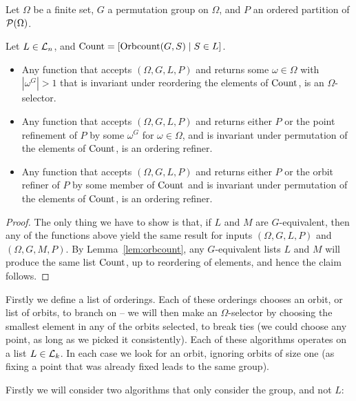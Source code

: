 \begin{lem}\label{lem:orbcount2}
  Let $\Omega$ be a finite set,  $G$ a permutation group on $\Omega$, and $P$
  an ordered partition of $\mathcal{P}(\Omega)$. 
  
  Let $L \in \mathcal{L}_n$, and
  \(\operatorname{Count} = [ \operatorname{Orbcount}(G,S) \mid S \in L ]\).

  \begin{itemize}
  \item Any function that accepts \((\Omega, G, L, P)\) and returns
    some \(\omega \in \Omega\) with $|\omega^G| > 1$ that is invariant
    under reordering the elements of \(\operatorname{Count}\), is an \(\Omega\)-selector.

  \item Any function that accepts \((\Omega, G, L, P)\) and returns
    either \(P\) or the point refinement of \(P\) by some \(\omega^G\) for
    \(\omega \in \Omega\), and is invariant under permutation of the elements
    of \(\operatorname{Count}\), is an ordering refiner.

  \item Any function that accepts \((\Omega, G, L, P)\) and returns either
    \(P\) or the orbit refiner of \(P\) by some member of \(\operatorname{Count}\) and is invariant
    under permutation of the elements of \(\operatorname{Count}\), is an ordering refiner.
\end{itemize}
\end{lem}

\begin{proof}
  The only thing we have to show is that, if $L$ and $M$ are $G$-equivalent, then
  any of the functions above yield the same result for inputs $(\Omega,G,L,P)$
  and $(\Omega,G,M,P)$.
  By Lemma~\ref{lem:orbcount}, any \(G\)-equivalent lists $L$ and $M$ will
  produce the same list \(\operatorname{Count}\), up to reordering of elements, and hence the
  claim follows.
\end{proof}

Firstly we define a list of orderings. Each of these orderings chooses an orbit,
or list of orbits, to branch on -- we will then make an \(\Omega\)-selector by
choosing the smallest element in any of the orbits selected, to break ties (we
could choose any point, as long as we picked it consistently). Each of these
algorithms operates on a list \(L \in \mathcal{L}_k\). In each case we look for an
orbit, ignoring orbits of size one (as fixing a point that was already fixed
leads to the same group).

Firstly we will consider two algorithms that only consider the group, and not \(L\):

